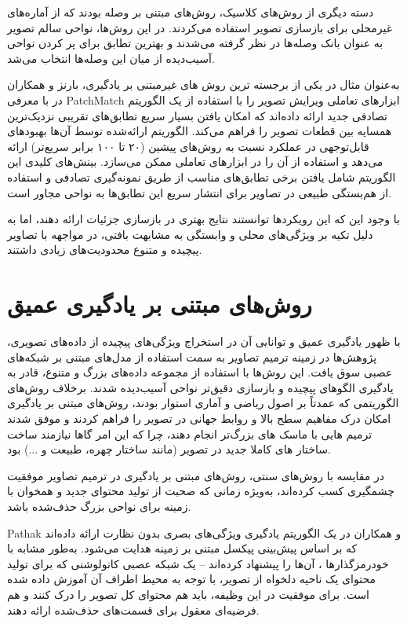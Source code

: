 دسته دیگری از روش‌های کلاسیک، روش‌های مبتنی بر وصله  بودند که از آماره‌های غیرمحلی برای بازسازی تصویر استفاده می‌کردند. در این روش‌ها، نواحی سالم تصویر به عنوان بانک وصله‌ها در نظر گرفته می‌شدند و بهترین تطابق برای پر کردن نواحی آسیب‌دیده از میان این وصله‌ها انتخاب می‌شد.

به‌عنوان مثال در یکی از برجسته ترین روش های غیرمبتنی بر یادگیری، بارنز و همکاران در \cite{barnesPatchMatchRandomizedCorrespondence2009} با معرفی PatchMatch ابزارهای تعاملی ویرایش تصویر را با استفاده از یک الگوریتم تصادفی جدید ارائه داده‌اند که امکان یافتن بسیار سریع تطابق‌های تقریبی نزدیک‌ترین همسایه بین قطعات تصویر را فراهم می‌کند. الگوریتم ارائه‌شده توسط آن‌ها بهبودهای قابل‌توجهی در عملکرد نسبت به روش‌های پیشین (۲۰ تا ۱۰۰ برابر سریع‌تر) ارائه می‌دهد و استفاده از آن را در ابزارهای تعاملی ممکن می‌سازد. بینش‌های کلیدی این الگوریتم شامل یافتن برخی تطابق‌های مناسب از طریق نمونه‌گیری تصادفی و استفاده از هم‌بستگی طبیعی در تصاویر برای انتشار سریع این تطابق‌ها به نواحی مجاور است.

با وجود این که این رویکردها توانستند نتایج بهتری در بازسازی جزئیات ارائه دهند، اما به دلیل تکیه بر ویژگی‌های محلی و وابستگی به مشابهت بافتی، در مواجهه با تصاویر پیچیده و متنوع محدودیت‌های زیادی داشتند.


\section{روش‌های مبتنی بر یادگیری عمیق}

با ظهور یادگیری عمیق و توانایی آن در استخراج ویژگی‌های پیچیده از داده‌های تصویری، پژوهش‌ها در زمینه ترمیم تصاویر به سمت استفاده از مدل‌های مبتنی بر شبکه‌های عصبی سوق یافت. این روش‌ها با استفاده از مجموعه داده‌های بزرگ و متنوع، قادر به یادگیری الگوهای پیچیده و بازسازی دقیق‌تر نواحی آسیب‌دیده شدند. برخلاف روش‌های الگوریتمی که عمدتاً بر اصول ریاضی و آماری استوار بودند، روش‌های مبتنی بر یادگیری امکان درک مفاهیم سطح بالا و روابط جهانی در تصویر را فراهم کردند و موفق شدند ترمیم هایی با  ماسک های بزرگ‌تر انجام دهند، چرا که این امر گاها نیازمند ساخت ساختار های کاملا جدید در تصویر (مانند ساختار چهره، طبیعت و ...) بود.



در مقایسه با روش‌های سنتی، روش‌های مبتنی بر یادگیری در ترمیم تصاویر موفقیت چشمگیری کسب کرده‌اند، به‌ویژه زمانی که صحبت از تولید محتوای جدید و همخوان با زمینه برای نواحی بزرگ حذف‌شده باشد.

Pathak
و همکاران در \cite{pathakContextEncodersFeature2016}
یک الگوریتم یادگیری ویژگی‌های بصری بدون نظارت  ارائه داده‌اند که بر اساس پیش‌بینی پیکسل مبتنی بر زمینه هدایت می‌شود. به‌طور مشابه با خودرمزگذارها
، آن‌ها  را پیشنهاد کرده‌اند – یک شبکه عصبی کانولوشنی که برای تولید محتوای یک ناحیه دلخواه از تصویر، با توجه به محیط اطراف آن آموزش داده شده است. برای موفقیت در این وظیفه،  باید هم محتوای کل تصویر را درک کنند و هم فرضیه‌ای معقول برای قسمت‌های حذف‌شده ارائه دهند.  

